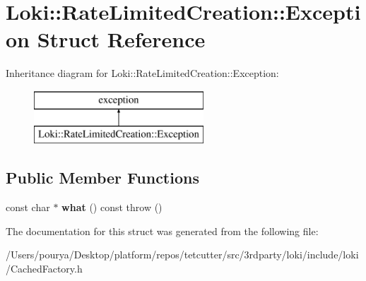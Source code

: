 \hypertarget{structLoki_1_1RateLimitedCreation_1_1Exception}{}\section{Loki\+:\+:Rate\+Limited\+Creation\+:\+:Exception Struct Reference}
\label{structLoki_1_1RateLimitedCreation_1_1Exception}
Inheritance diagram for Loki\+:\+:Rate\+Limited\+Creation\+:\+:Exception\+:\begin{figure}[H]
\begin{center}
\leavevmode
\includegraphics[height=2.000000cm]{structLoki_1_1RateLimitedCreation_1_1Exception}
\end{center}
\end{figure}
\subsection*{Public Member Functions}
\begin{DoxyCompactItemize}
\item 
\hypertarget{structLoki_1_1RateLimitedCreation_1_1Exception_a1f48c2210720134406bc98f8a241d248}{}const char $\ast$ {\bfseries what} () const   throw ()\label{structLoki_1_1RateLimitedCreation_1_1Exception_a1f48c2210720134406bc98f8a241d248}

\end{DoxyCompactItemize}


The documentation for this struct was generated from the following file\+:\begin{DoxyCompactItemize}
\item 
/\+Users/pourya/\+Desktop/platform/repos/tetcutter/src/3rdparty/loki/include/loki/Cached\+Factory.\+h\end{DoxyCompactItemize}
